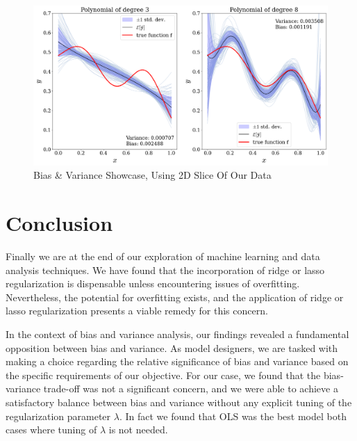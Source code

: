 \documentclass[twoside,11pt]{report}
\begin{document}
\begin{figure}[!h]
    \begin{center}
        \includegraphics[width=1.0\textwidth]{../runsAndAdditions/bias-variance2.png}
    \end{center}
    \caption{Bias \& Variance Showcase, Using 2D Slice Of Our Data}\label{fig:bias-variance2}
\end{figure}








\section{Conclusion}
\label{sec:conclusion}

Finally we are at the end of our exploration of machine learning and data analysis techniques. 
We have found that the incorporation of ridge or lasso regularization is dispensable unless encountering issues of overfitting. 
Nevertheless, the potential for overfitting exists, and the application of ridge or lasso regularization presents a viable remedy for this concern.

In the context of bias and variance analysis, our findings revealed a fundamental opposition between bias and variance. 
As model designers, we are tasked with making a choice regarding the relative significance of bias and variance based on the specific requirements of our objective.
For our case, we found that the bias-variance trade-off was not a significant concern, and we were able to achieve a satisfactory balance between bias and variance without any explicit tuning of the regularization parameter $\lambda$.
In fact we found that OLS was the best model both cases where tuning of $\lambda$ is not needed.
\end{document}
